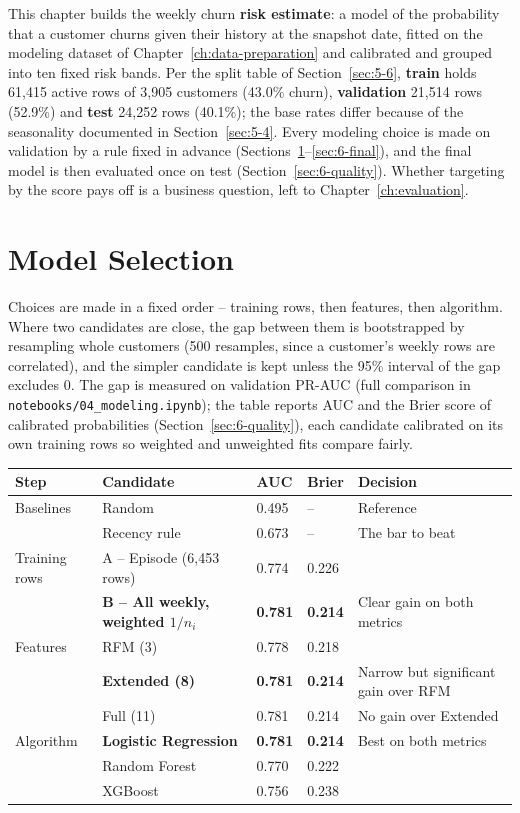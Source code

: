 This chapter builds the weekly churn \textbf{risk estimate}: a model of the probability that a customer churns given their history at the snapshot date, fitted on the modeling dataset of Chapter~\ref{ch:data-preparation} and calibrated and grouped into ten fixed risk bands. Per the split table of Section~\ref{sec:5-6}, \textbf{train} holds 61,415 active rows of 3,905 customers (43.0\% churn), \textbf{validation} 21,514 rows (52.9\%) and \textbf{test} 24,252 rows (40.1\%); the base rates differ because of the seasonality documented in Section~\ref{sec:5-4}. Every modeling choice is made on validation by a rule fixed in advance (Sections~\ref{sec:6-select}--\ref{sec:6-final}), and the final model is then evaluated once on test (Section~\ref{sec:6-quality}). Whether targeting by the score pays off is a business question, left to Chapter~\ref{ch:evaluation}.

\section{Model Selection}
\label{sec:6-select}

Choices are made in a fixed order -- training rows, then features, then algorithm. Where two candidates are close, the gap between them is bootstrapped by resampling whole customers (500 resamples, since a customer's weekly rows are correlated), and the simpler candidate is kept unless the 95\% interval of the gap excludes 0. The gap is measured on validation PR-AUC (full comparison in \texttt{notebooks/04\_modeling.ipynb}); the table reports AUC and the Brier score of calibrated probabilities (Section~\ref{sec:6-quality}), each candidate calibrated on its own training rows so weighted and unweighted fits compare fairly.

\begin{center}
\begin{tabular}{@{}p{2.2cm}p{4.3cm}p{1.4cm}p{1.4cm}p{4.6cm}@{}}
    \toprule
    Step & Candidate & AUC & Brier & Decision \\
    \midrule
    Baselines & Random & 0.495 & -- & Reference \\
     & Recency rule & 0.673 & -- & The bar to beat \\
    \midrule
    Training rows & A -- Episode (6,453 rows) & 0.774 & 0.226 & \\
     & \textbf{B -- All weekly, weighted $1/n_i$} & \textbf{0.781} & \textbf{0.214} & Clear gain on both metrics \\
    \midrule
    Features & RFM (3) & 0.778 & 0.218 & \\
     & \textbf{Extended (8)} & \textbf{0.781} & \textbf{0.214} & Narrow but significant gain over RFM \\
     & Full (11) & 0.781 & 0.214 & No gain over Extended \\
    \midrule
    Algorithm & \textbf{Logistic Regression} & \textbf{0.781} & \textbf{0.214} & Best on both metrics \\
     & Random Forest & 0.770 & 0.222 & \\
     & XGBoost & 0.756 & 0.238 & \\
    \bottomrule
\end{tabular}
\end{center}

